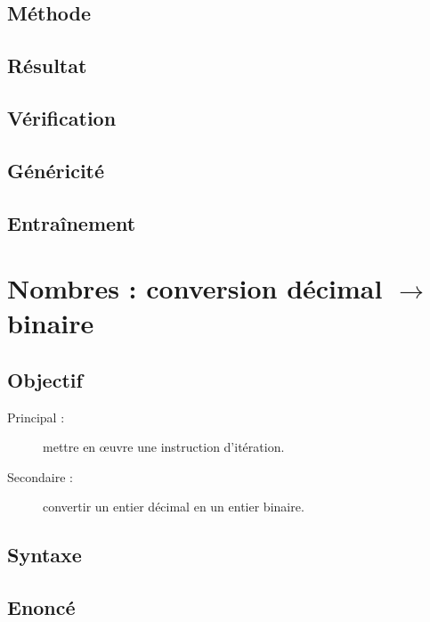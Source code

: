 \subsection{Méthode}\label{boucles:textes:methode}

\subsection{Résultat}\label{boucles:textes:resultat}

\subsection{Vérification}\label{boucles:textes:verification}

\subsection{Généricité}\label{boucles:textes:genericite}

\subsection{Entraînement}\label{boucles:textes:entrainement}

\section{Nombres : conversion décimal $\rightarrow$ binaire}\label{boucles:nombres}

\subsection{Objectif}\label{boucles:nombres:objectif}
\begin{description}
\item[Principal : ] mettre en \oe uvre une instruction d'itération.
\item[Secondaire :] convertir un entier décimal en un entier binaire.
\end{description}

\subsection{Syntaxe \python}\label{boucles:nombres:python}

\subsection{Enoncé}\label{boucles:nombres:enonce}

